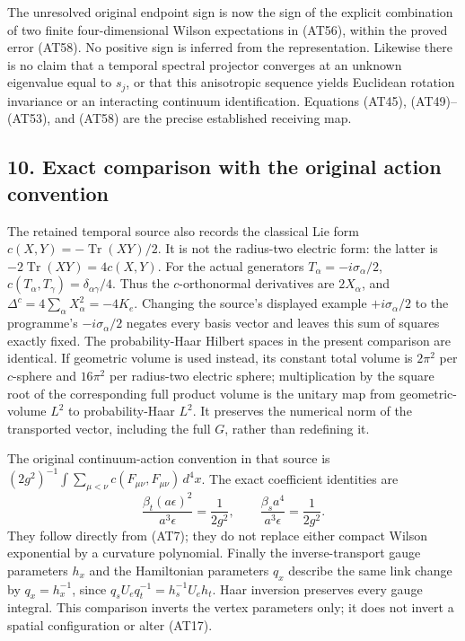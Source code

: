 \documentclass[11pt]{article}
\begin{document}
The unresolved original endpoint sign is now the sign of the explicit combination of two finite four-dimensional Wilson expectations in (AT56), within the proved error (AT58). No positive sign is inferred from the representation. Likewise there is no claim that a temporal spectral projector converges at an unknown eigenvalue equal to \(s_j\), or that this anisotropic sequence yields Euclidean rotation invariance or an interacting continuum identification. Equations (AT45), (AT49)–(AT53), and (AT58) are the precise established receiving map.

\subsection*{10. Exact comparison with the original action convention}

The retained temporal source also records the classical Lie form
\(c(X,Y)=-\operatorname{Tr}(XY)/2\). It is not the radius-two electric form:
the latter is \(-2\operatorname{Tr}(XY)=4c(X,Y)\).
For the actual generators \(T_\alpha=-i\sigma_\alpha/2\),
\(c(T_\alpha,T_\gamma)=\delta_{\alpha\gamma}/4\).
Thus the \(c\)-orthonormal derivatives are \(2X_\alpha\), and
\(\Delta^c=4\sum_\alpha X_\alpha^2=-4K_e\).
Changing the source's displayed example \(+i\sigma_\alpha/2\) to the programme's \(-i\sigma_\alpha/2\) negates every basis vector and leaves this sum of squares exactly fixed. The probability-Haar Hilbert spaces in the present comparison are identical. If geometric volume is used instead, its constant total volume is \(2\pi^2\) per \(c\)-sphere and \(16\pi^2\) per radius-two electric sphere; multiplication by the square root of the corresponding full product volume is the unitary map from geometric-volume \(L^2\) to probability-Haar \(L^2\). It preserves the numerical norm of the transported vector, including the full \(G\), rather than redefining it.

The original continuum-action convention in that source is
\((2g^2)^{-1}\int\sum_{\mu<\nu}c(F_{\mu\nu},F_{\mu\nu})\,d^4x\).
The exact coefficient identities are
\[
 \frac{\beta_t(a\epsilon)^2}{a^3\epsilon}
     =\frac1{2g^2},\qquad
 \frac{\beta_s a^4}{a^3\epsilon}
     =\frac1{2g^2}.
\]
They follow directly from (AT7); they do not replace either compact Wilson exponential by a curvature polynomial.
Finally the inverse-transport gauge parameters \(h_x\) and the Hamiltonian parameters \(q_x\) describe the same link change by \(q_x=h_x^{-1}\), since
\(q_sU_eq_t^{-1}=h_s^{-1}U_eh_t\).
Haar inversion preserves every gauge integral. This comparison inverts the vertex parameters only; it does not invert a spatial configuration or alter (AT17).
\end{document}
